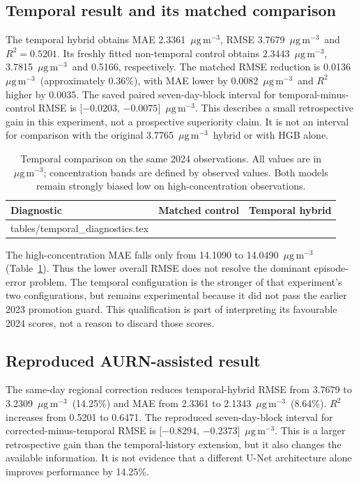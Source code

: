 \documentclass[11pt,a4paper]{article}
\makeatletter
\newcommand{\ug}{\ensuremath{\mu\mathrm{g}\,\mathrm{m}^{-3}}}
\newcommand{\tableinput}[1]{\@@input #1 }
\makeatother
\begin{document}
\subsection{Temporal result and its matched comparison}
\label{sec:temporal-results}
The temporal hybrid obtains MAE 2.3361~\ug, RMSE 3.7679~\ug\ and
$R^2=0.5201$. Its freshly fitted non-temporal control obtains 2.3443~\ug,
3.7815~\ug\ and 0.5166, respectively. The matched RMSE reduction is
0.0136~\ug\ (approximately 0.36\%), with MAE lower by 0.0082~\ug\ and
$R^2$ higher by 0.0035. The saved paired seven-day-block interval for
temporal-minus-control RMSE is [$-0.0203$, $-0.0075$]~\ug. This describes
a small retrospective gain in this experiment, not a prospective superiority
claim. It is not an interval for comparison with the original 3.7765~\ug\
hybrid or with HGB alone.

\begin{table}[tb]
\caption{Temporal comparison on the same 2024 observations. All values are
in \ug; concentration bands are defined by observed values. Both models
remain strongly biased low on high-concentration observations.}
\label{tab:temporal-diagnostics}
\centering\small
\begin{tabular}{@{}lrr@{}}
\toprule
Diagnostic & Matched control & Temporal hybrid \\
\midrule
\tableinput{tables/temporal_diagnostics.tex}
\bottomrule
\end{tabular}
\end{table}

The high-concentration MAE falls only from 14.1090 to 14.0490~\ug
(Table~\ref{tab:temporal-diagnostics}). Thus the lower overall RMSE does not
resolve the dominant episode-error problem. The temporal configuration is
the stronger of that experiment's two configurations, but remains experimental because
it did not pass the earlier 2023 promotion guard. This qualification is part
of interpreting its favourable 2024 scores, not a reason to discard those scores.

\subsection{Reproduced AURN-assisted result}
\label{sec:aurn-results}
The same-day regional correction reduces temporal-hybrid RMSE from 3.7679 to
3.2309~\ug\ (14.25\%) and MAE from 2.3361 to 2.1343~\ug\ (8.64\%).
$R^2$ increases from 0.5201 to 0.6471. The reproduced seven-day-block interval
for corrected-minus-temporal RMSE is [$-0.8294$, $-0.2373$]~\ug.
This is a larger retrospective gain than the temporal-history extension,
but it also changes the available information. It is not evidence that a
different U-Net architecture alone improves performance by 14.25\%.
\end{document}
